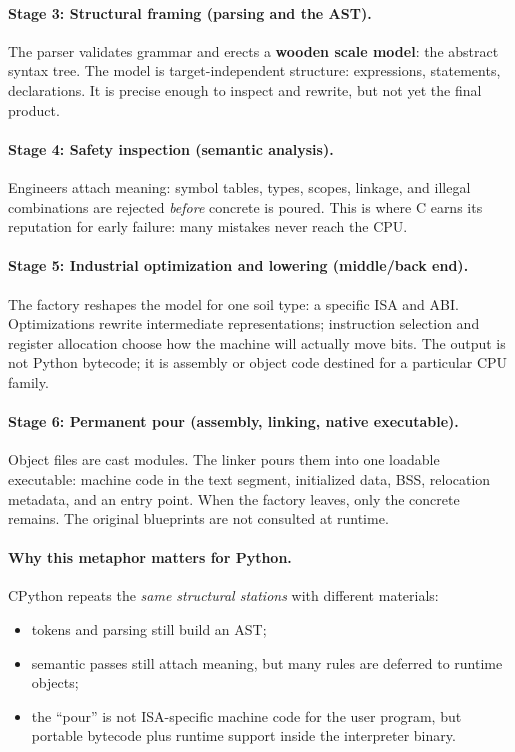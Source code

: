 \paragraph{Stage 3: Structural framing (parsing and the AST).}
The parser validates grammar and erects a \textbf{wooden scale model}: the abstract syntax tree. The model is target-independent structure: expressions, statements, declarations. It is precise enough to inspect and rewrite, but not yet the final product.

\paragraph{Stage 4: Safety inspection (semantic analysis).}
Engineers attach meaning: symbol tables, types, scopes, linkage, and illegal combinations are rejected \emph{before} concrete is poured. This is where C earns its reputation for early failure: many mistakes never reach the CPU.

\paragraph{Stage 5: Industrial optimization and lowering (middle/back end).}
The factory reshapes the model for one soil type: a specific ISA and ABI. Optimizations rewrite intermediate representations; instruction selection and register allocation choose how the machine will actually move bits. The output is not Python bytecode; it is assembly or object code destined for a particular CPU family.

\paragraph{Stage 6: Permanent pour (assembly, linking, native executable).}
Object files are cast modules. The linker pours them into one loadable executable: machine code in the text segment, initialized data, BSS, relocation metadata, and an entry point. When the factory leaves, only the concrete remains. The original blueprints are not consulted at runtime.

\paragraph{Why this metaphor matters for Python.}
CPython repeats the \emph{same structural stations} with different materials:
\begin{itemize}
    \item tokens and parsing still build an AST;
    \item semantic passes still attach meaning, but many rules are deferred to runtime objects;
    \item the ``pour'' is not ISA-specific machine code for the user program, but portable bytecode plus runtime support inside the interpreter binary.
\end{itemize}

